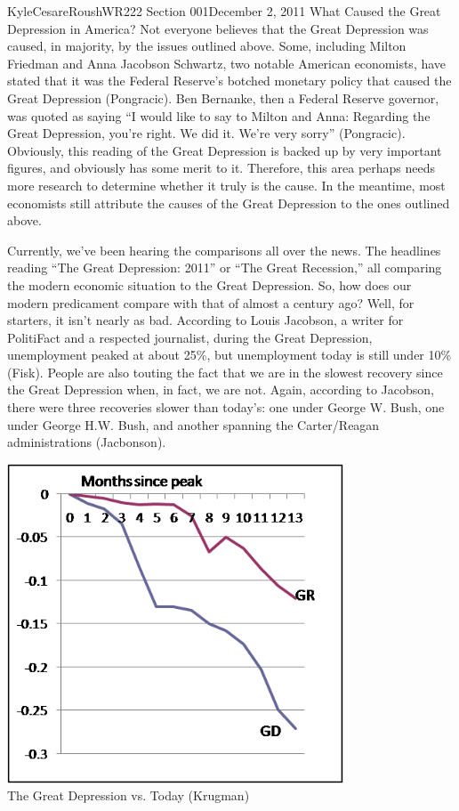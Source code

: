 \documentclass[12pt,letterpaper]{article}
\begin{document}
\begin{mla}{Kyle}{Cesare}{Roush}{WR222 Section 001}{December 2, 2011}{
What Caused the Great Depression in America?}
Not everyone believes that the Great Depression was caused, in majority, by the
issues outlined above.  Some, including Milton Friedman and Anna Jacobson
Schwartz, two notable American economists, have stated that it was the Federal
Reserve's botched monetary policy that caused the Great Depression (Pongracic).
Ben Bernanke, then a Federal Reserve governor, was quoted as saying ``I would
like to say to Milton and Anna: Regarding the Great Depression, you're right.
We did it.  We're very sorry'' (Pongracic).  Obviously, this reading of the
Great Depression is backed up by very important figures, and obviously has some
merit to it.  Therefore, this area perhaps needs more research to determine
whether it truly is the cause.  In the meantime, most economists still attribute
the causes of the Great Depression to the ones outlined above.

Currently, we've been hearing the comparisons all over the news.  The headlines
reading ``The Great Depression: 2011'' or ``The Great Recession,'' all comparing
the modern economic situation to the Great Depression.  So, how does our modern
predicament compare with that of almost a century ago?  Well, for starters, it
isn't nearly as bad.  According to Louis Jacobson, a writer for PolitiFact and a
respected journalist, during the Great Depression, unemployment peaked at about
25\%, but unemployment today is still under 10\% (Fisk).  People are also
touting the fact that we are in the slowest recovery since the Great Depression
when, in fact, we are not.  Again, according to Jacobson, there were three
recoveries slower than today's: one under George W. Bush, one under George H.W.
Bush, and another spanning the Carter/Reagan administrations (Jacbonson).

\begin{center}
\includegraphics[width=10cm]{essay_3_gr_vs_gd} \\
The Great Depression vs. Today (Krugman)
\end{center}


\end{mla}
\end{document}
